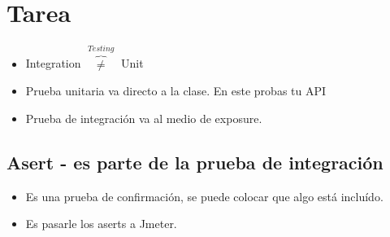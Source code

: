 \section{Tarea}
\begin{itemize}
    \item Integration $\overbrace{\neq}^{Testing}$ Unit
    \item Prueba unitaria va directo a la clase. En este probas tu API
    \item Prueba de integración va al medio de exposure.
\end{itemize}


\subsection{Asert - es parte de la prueba de integración}
\begin{itemize}
    \item Es una prueba de confirmación, se puede colocar que algo está incluído.
    \item Es pasarle los aserts a Jmeter.
\end{itemize}
